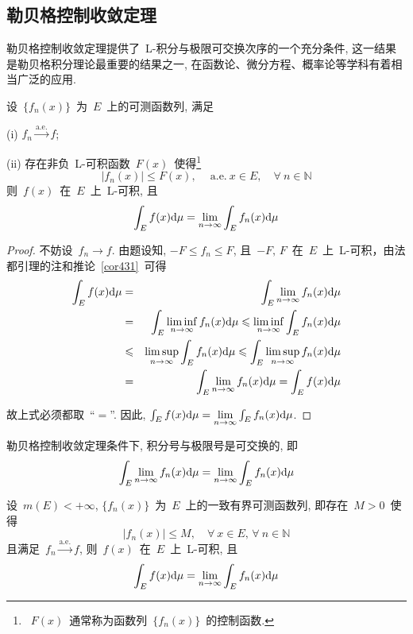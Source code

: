 \subsection{勒贝格控制收敛定理}

勒贝格控制收敛定理提供了~L-积分与极限可交换次序的一个充分条件, 这一结果是勒贝格积分理论最重要的结果之一, 在函数论、微分方程、概率论等学科有着相当广泛的应用.

\begin{theorem}
设~$\{f_n(x)\}$~为~$E$~上的可测函数列, 满足

(i) $f_n \xrightarrow{\mathrm{a.e.}} f$;

(ii) 存在非负~L-可积函数~$F(x)$~使得\footnote{~$F(x)$~通常称为函数列~$\{f_n(x)\}$~的控制函数. }
\[
|f_n(x)| \leqslant F(x),  \quad \mathrm{~a.e.~} x \in E,\quad  \forall~n \in \mathbb{N}
\]
则~$f(x)$~在~$E$~上~L-可积, 且
\[
\int_E f(x) \mathrm{d} \mu = \lim_{n \to \infty} \int_E f_n(x) \mathrm{d} \mu
\]
\end{theorem}

\begin{proof}
不妨设~$f_n \to f$. 由题设知, $-F \leq f_n \leq F$, 且~$-F, \, F$~在~$E$~上~L-可积，由法都引理的注和推论~\ref{cor431}~可得
\begin{eqnarray*}
\int_E f(x) \mathrm{d} \mu &=& \int_E \lim_{n \to \infty} f_n(x) \mathrm{d} \mu \\
&=& \int_E \liminf_{n \to \infty} f_n(x) \mathrm{d} \mu \leqslant \liminf_{n \to \infty} \int_E f_n(x) \mathrm{d} \mu \\
&\leqslant& \limsup_{n \to \infty} \int_E f_n(x) \mathrm{d} \mu \leqslant \int_E \limsup_{n \to \infty} f_n(x) \mathrm{d} \mu \\
&=& \int_E \lim_{n \to \infty} f_n(x) \mathrm{d} \mu = \int_E f(x) \mathrm{d} \mu
\end{eqnarray*}

故上式必须都取~``$=$''. 因此, $\int_E f(x) \mathrm{d} \mu = \lim\limits_{n \to \infty} \int_E f_n(x) \mathrm{d} \mu$.
\end{proof}

\begin{remark}
勒贝格控制收敛定理条件下, 积分号与极限号是可交换的, 即
\[
\int_E \lim_{n \to \infty} f_n(x) \mathrm{d} \mu = \lim_{n \to \infty} \int_E f_n(x) \mathrm{d} \mu
\]
\end{remark}

\begin{corollary}[有界收敛定理]
设~$m(E) < +\infty$, $\{f_n(x)\}$~为~$E$~上的一致有界可测函数列, 即存在~$M > 0$~使得
\[
|f_n(x)| \leqslant M,\quad  \forall~ x \in E,\,  \forall~n \in \mathbb{N}
\]
且满足~$f_n \xrightarrow{\mathrm{a.e.}} f$, 则~$f(x)$~在~$E$~上~L-可积, 且
\[
\int_E f(x) \mathrm{d} \mu = \lim_{n \to \infty} \int_E f_n(x) \mathrm{d} \mu
\]
\end{corollary}

